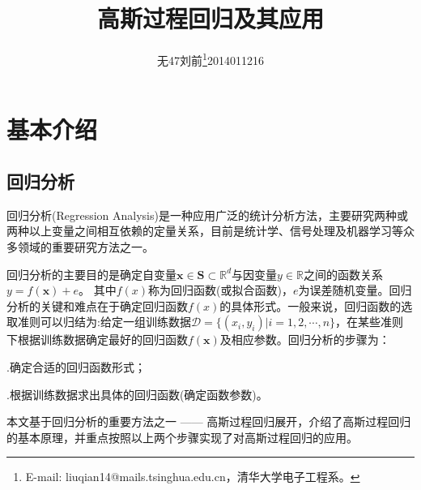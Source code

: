 \documentclass[10pt,twocolumn]{article}
\begin{document}
\title{\textbf{高斯过程回归及其应用}}
\author{无47\hspace{2em}刘前\thanks{E-mail: liuqian14@mails.tsinghua.edu.cn，清华大学电子工程系。}\hspace{2em}2014011216\hspace{2em}}
\date{}

\maketitle


\section{基本介绍}

\subsection{回归分析}
回归分析(Regression Analysis)是一种应用广泛的统计分析方法，主要研究两种或两种以上变量之间相互依赖的定量关系，目前是统计学、信号处理及机器学习等众多领域的重要研究方法之一。

回归分析的主要目的是确定自变量$\mathbf{x}\in\mathbf{S}\subset{\mathbb{R}^{d}}$与因变量$y\in\mathbb{R}$之间的函数关系$y=f(\mathbf{x})+e$。
其中$f(x)$称为回归函数(或拟合函数)，$e$为误差随机变量。回归分析的关键和难点在于确定回归函数$f(x)$的具体形式。一般来说，回归函数的选取准则可以归结为:给定一组训练数据$\mathscr{D} = \{(x_{i},y_{i})\vert i = 1,2,\cdots,n\}$，在某些准则下根据训练数据确定最好的回归函数$f(\mathbf{x})$及相应参数。回归分析的步骤为：

{}.{\kaishu 确定合适的回归函数形式；}

{}.{\kaishu 根据训练数据求出具体的回归函数(确定函数参数)。}

本文基于回归分析的重要方法之一 —— 高斯过程回归展开，介绍了高斯过程回归的基本原理，并重点按照以上两个步骤实现了对高斯过程回归的应用。
\end{document}
